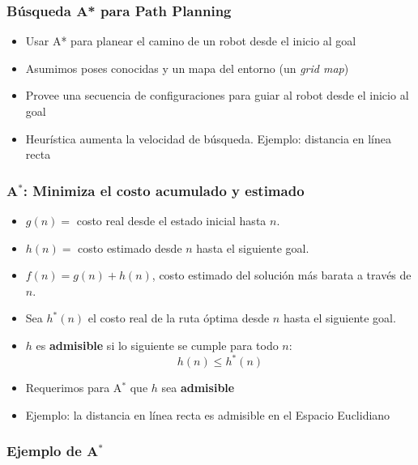 \begin{frame}
    \frametitle{Búsqueda A* para Path Planning}
    
    \begin{itemize}
        \item Usar A* para planear el camino de un robot desde el inicio al goal
        \item Asumimos poses conocidas y un mapa del entorno (un \emph{grid map})
        \item Provee una secuencia de configuraciones para guiar al robot desde el inicio al goal
        \item Heurística aumenta la velocidad de búsqueda. Ejemplo: distancia en línea recta
    \end{itemize}

\end{frame}


\begin{frame}
    \frametitle{A$^{*}$: Minimiza el costo acumulado y estimado}
    
    \begin{itemize}
        \item $g(n) =$ costo real desde el estado inicial hasta $n$.
        \item $h(n) =$ costo estimado desde $n$ hasta el siguiente goal.
        \item $f(n) = g(n) + h(n)$, costo estimado del solución más barata a través de $n$.
        \item Sea $h^{*}(n)$ el costo real de la ruta óptima desde $n$ hasta el siguiente goal.
        \item $h$ es \textbf{admisible} si lo siguiente se cumple para todo $n$:
        \begin{equation*}
            h(n) \leq h^{*}(n)
        \end{equation*}
        \item Requerimos para A$^{*}$ que $h$ sea \textbf{admisible}
        \item Ejemplo: la distancia en línea recta es admisible en el Espacio Euclidiano
    \end{itemize}
    
\end{frame}

\begin{frame}
    \frametitle{Ejemplo de A$^{*}$}
    
    
    
\end{frame}


